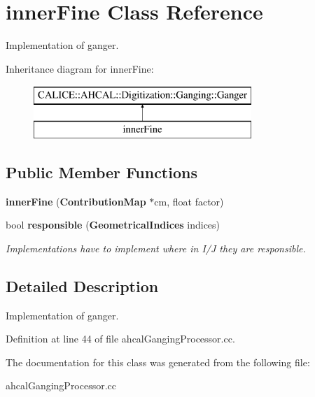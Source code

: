 \section{inner\-Fine Class Reference}
\label{classinnerFine}


Implementation of ganger.  


Inheritance diagram for inner\-Fine\-:\begin{figure}[H]
\begin{center}
\leavevmode
\includegraphics[height=2.000000cm]{classinnerFine}
\end{center}
\end{figure}
\subsection*{Public Member Functions}
\begin{DoxyCompactItemize}
\item 
{\bfseries inner\-Fine} ({\bf Contribution\-Map} $\ast$cm, float factor)\label{classinnerFine_a9c0cef5d4f92b6f0355ea85f5ec30df5}

\item 
bool {\bf responsible} ({\bf Geometrical\-Indices} indices)\label{classinnerFine_a4e260cbea93dfdbeb8cdd524b2fc6609}

\begin{DoxyCompactList}\small\item\em Implementations have to implement where in I/\-J they are responsible. \end{DoxyCompactList}\end{DoxyCompactItemize}


\subsection{Detailed Description}
Implementation of ganger. 

Definition at line 44 of file ahcal\-Ganging\-Processor.\-cc.



The documentation for this class was generated from the following file\-:\begin{DoxyCompactItemize}
\item 
ahcal\-Ganging\-Processor.\-cc\end{DoxyCompactItemize}
